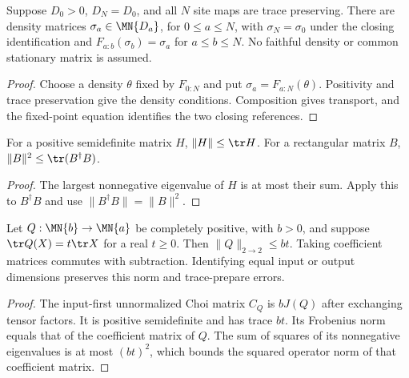 \begin{theorem}
    \label{thm:rectangular_cyclic_densities}
    \leanok
    Suppose $D_0>0$, $D_N=D_0$, and all $N$ site maps are trace preserving.
    There are density matrices $\sigma_a\in\MN{D_a}$, for $0\le a\le N$,
    with $\sigma_N=\sigma_0$ under the closing identification and
    $F_{a:b}(\sigma_b)=\sigma_a$ for $a\le b\le N$.
    No faithful density or common stationary matrix is assumed.
\end{theorem}
\begin{proof}\leanok
    Choose a density $\theta$ fixed by $F_{0:N}$ and put
    $\sigma_a=F_{a:N}(\theta)$. Positivity and trace preservation give
    the density conditions. Composition gives transport, and the fixed-point
    equation identifies the two closing references.
\end{proof}

\begin{theorem}
    \label{thm:matrix_operator_trace_bounds}
    \leanok
    For a positive semidefinite matrix $H$, $\|H\|\le\tr H$.
    For a rectangular matrix $B$, $\|B\|^2\le\tr(B^\dagger B)$.
\end{theorem}
\begin{proof}\leanok
    The largest nonnegative eigenvalue of $H$ is at most their sum.
    Apply this to $B^\dagger B$ and use $\|B^\dagger B\|=\|B\|^2$.
\end{proof}

\begin{theorem}
    \label{thm:rectangular_scaled_trace_bound}
    \leanok
    Let $Q:\MN{b}\to\MN{a}$ be completely positive, with $b>0$, and suppose
    $\tr Q(X)=t\tr X$ for a real $t\ge0$. Then $\|Q\|_{2\to2}\le bt$.
    Taking coefficient matrices commutes with subtraction. Identifying equal
    input or output dimensions preserves this norm and trace-prepare errors.
\end{theorem}
\begin{proof}\leanok
    The input-first unnormalized Choi matrix $C_Q$ is $bJ(Q)$ after exchanging
    tensor factors. It is positive semidefinite and has trace $bt$.
    Its Frobenius norm equals that of the coefficient matrix of $Q$.
    The sum of squares of its nonnegative eigenvalues is at most $(bt)^2$,
    which bounds the squared operator norm of that coefficient matrix.
\end{proof}

